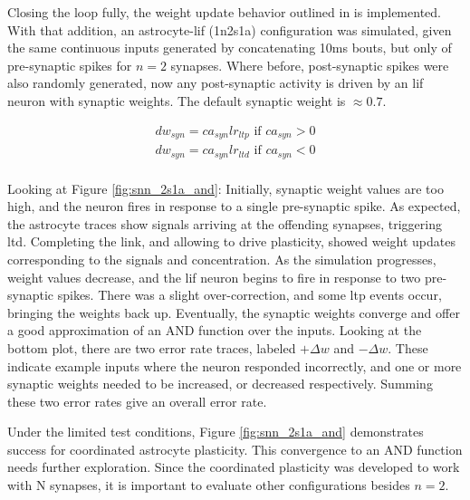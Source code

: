 Closing the loop fully, the weight update behavior outlined in
 is implemented. With that addition, an astrocyte-\gls{lif}
(1n2s1a) configuration was simulated, given the same continuous inputs generated
by concatenating 10ms bouts, but only of pre-synaptic spikes for $n=2$
synapses. Where before, post-synaptic spikes were also randomly generated, now
any post-synaptic activity is driven by an \gls{lif} neuron with synaptic
weights.  The default synaptic weight is $\approx 0.7$.

\begin{align}
  dw_{syn} = ca_{syn} lr_{ltp} \textrm{ if } ca_{syn} >
  0 \label{eq:astro_and_dw} \\
  dw_{syn} = ca_{syn} lr_{ltd} \textrm{ if } ca_{syn} < 0 \\
\end{align}



Looking at Figure \ref{fig:snn_2s1a_and}: Initially, synaptic weight values are
too high, and the neuron fires in response to a single pre-synaptic spike. As
expected, the astrocyte traces show \dser signals arriving at the offending
synapses, triggering \gls{ltd}. Completing the link, and allowing \ca to drive
plasticity, showed weight updates corresponding to the \dser signals and \ca
concentration. As the simulation progresses, weight values decrease, and the \gls{lif}
neuron begins to fire in response to two pre-synaptic spikes. There was a slight
over-correction, and some \gls{ltp} events occur, bringing the weights back
up. Eventually, the synaptic weights converge and offer a good approximation of
an AND function over the inputs. Looking at the bottom plot, there are two error
rate traces, labeled $+\Delta w$ and $-\Delta w$. These indicate example inputs
where the neuron responded incorrectly, and one or more synaptic weights needed
to be increased, or decreased respectively. Summing these two error rates give
an overall error rate.

Under the limited test conditions, Figure \ref{fig:snn_2s1a_and} demonstrates
success for coordinated astrocyte plasticity. This convergence to an AND
function needs further exploration. Since the coordinated plasticity was
developed to work with N synapses, it is important to evaluate other
configurations besides $n=2$.

